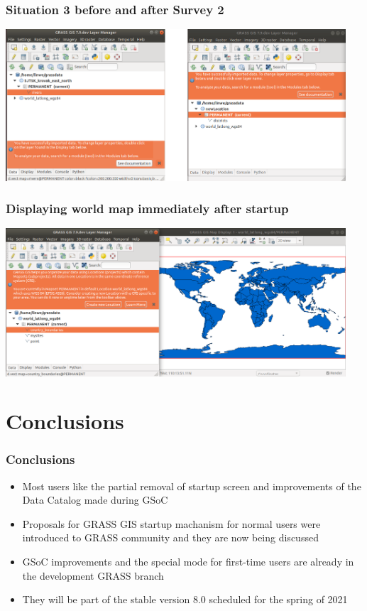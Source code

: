 \documentclass[aspectratio=169]{beamer}
\begin{document}
\begin{frame}
\frametitle{Situation 3 before and after Survey 2}
	\centering
        \includegraphics[width=0.95\textwidth]{pictures/info3.PNG}
\end{frame}

\begin{frame}
\frametitle{Displaying world map immediately after startup}
	\centering
        \includegraphics[width=0.95\textwidth]{pictures/po_prvnich_trech_PRs.PNG}
\end{frame}

\section{Conclusions}

\begin{frame}
\frametitle{Conclusions}
\begin{itemize}
\item{Most users like the partial removal of startup screen and improvements of the Data Catalog made during GSoC}
\vspace{0.5cm}
\item{Proposals for GRASS GIS startup machanism for normal users were introduced to GRASS community and they are now being discussed}
\vspace{0.5cm}
\item{GSoC improvements and the special mode for first-time users are already in the development GRASS branch}
\vspace{0.5cm}
\item{They will be part of the stable version 8.0 scheduled for the spring of 2021}
\end{itemize}
\end{frame}
\end{document}

